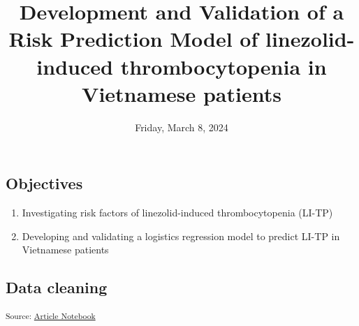 \documentclass[
  letterpaper,
  DIV=11,
  numbers=noendperiod]{scrartcl}
\title{Development and Validation of a Risk Prediction Model of
linezolid-induced thrombocytopenia in Vietnamese patients}
\author{}
\date{Friday, March 8, 2024}
\providecommand{\tightlist}{%
  \setlength{\itemsep}{0pt}\setlength{\parskip}{0pt}}\usepackage{longtable,booktabs,array}
\begin{document}
\maketitle

\subsection{Objectives}\label{objectives}

\begin{enumerate}
\def\labelenumi{\arabic{enumi}.}
\tightlist
\item
  Investigating risk factors of linezolid-induced thrombocytopenia
  (LI-TP)
\item
  Developing and validating a logistics regression model to predict
  LI-TP in Vietnamese patients
\end{enumerate}

\subsection{Data cleaning}\label{data-cleaning}

\textsubscript{Source:
\href{https://AnTangQuoc.github.io/LZD-TP-pred-model/index.qmd.html}{Article
Notebook}}
\end{document}

